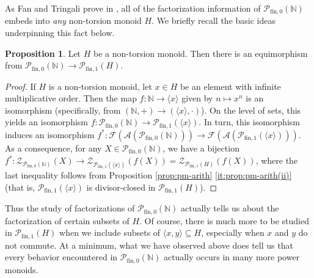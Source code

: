 \documentclass{report}
\newcommand{\A}{\mathcal{A}}
\newcommand{\F}{\mathcal{F}}
\newcommand{\NN}{\mathbb{N}}
\renewcommand{\P}{\mathcal{P}}
\newcommand{\ZZ}{\mathbb{Z}}
\newcommand{\Z}{\mathcal{Z}}
\newcommand{\gen}[1]{\langle #1 \rangle}
\newcommand{\fin}{\textrm{fin}}
\newcommand{\fun}{{\textrm{fin}, 1}}
\newcommand{\fon}{{\textrm{fin}, 0}}
\renewcommand{\:}{\text{:}}
\newcommand{\PN}{{\P_{\fin,0}(\NN)}}
\theoremstyle{definition}
\newtheorem{prop}[defn]{Proposition}
\begin{document}





As Fan and Tringali prove in \cite[Theorem 3.8, Theorem 4.11]{fan-tringali18}, all of the factorization information of $\PN$ embeds into \textit{any} non-torsion monoid $H$.
We briefly recall the basic ideas underpinning this fact below.

\begin{prop}\label{prop:natural-to-non-tors}
	Let $H$ be a non-torsion monoid.
	Then there is an equimorphism from $\PN \to \P_\fun(H)$.
\end{prop}
\begin{proof}
	If $H$ is a non-torsion monoid, let $x\in H$ be an element with infinite multiplicative order.  
	Then the map $f: \NN \to \gen{x}$ given by $n\mapsto x^n$ is an isomorphism (specifically, from $(\NN,+)\to (\gen{x},\cdot)$).
	On the level of sets, this yields an isomorphism $f: \PN \to \P_\fun(\gen{x})$.
	In turn, this isomorphism induces an isomorphism $f^*: \F(\A(\PN)) \to \F(\A(\P_\fun(\gen{x})))$.
	As a consequence, for any $X \in \PN$, we have a bijection $f^*: \Z_{\PN}(X) \to \Z_{\P_\fun(\gen{x})}(f(X)) = \Z_{\P_\fun(H)}(f(X))$, where the last inequality follows from Proposition \ref{prop:pm-arith} \ref{it:prop:pm-arith(ii)} (that is, $\P_\fun(\gen{x})$ is divisor-closed in $\P_\fun(H)$).
\end{proof}

Thus the study of factorizations of $\PN$ actually tells us about the factorization of certain subsets of $H$.
Of course, there is much more to be studied in $\P_\fun(H)$ when we include subsets of $\gen{x,y}\subseteq H$, especially when $x$ and $y$ do not commute.
At a minimum, what we have observed above does tell us that every behavior encountered in $\PN$ actually occurs in many more power monoids.
\end{document}
